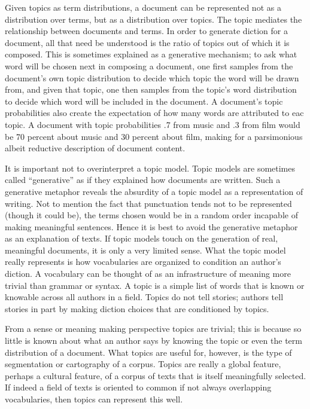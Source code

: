 \documentclass[]{book}
\theoremstyle{definition}
\theoremstyle{definition}
\theoremstyle{definition}
\theoremstyle{remark}
\begin{document}
Given topics as term distributions, a document can be represented not as
a distribution over terms, but as a distribution over topics. The topic
mediates the relationship between documents and terms. In order to
generate diction for a document, all that need be understood is the
ratio of topics out of which it is composed. This is sometimes explained
as a generative mechanism; to ask what word will be chosen next in
composing a document, one first samples from the document's own topic
distribution to decide which topic the word will be drawn from, and
given that topic, one then samples from the topic's word distribution to
decide which word will be included in the document. A document's topic
probabilities also create the expectation of how many words are
attributed to eac topic. A document with topic probabilities .7 from
music and .3 from film would be 70 percent about music and 30 percent
about film, making for a parsimonious albeit reductive description of
document content.

It is important not to overinterpret a topic model. Topic models are
sometimes called ``generative'' as if they explained how documents are
written. Such a generative metaphor reveals the absurdity of a topic
model as a representation of writing. Not to mention the fact that
punctuation tends not to be represented (though it could be), the terms
chosen would be in a random order incapable of making meaningful
sentences. Hence it is best to avoid the generative metaphor as an
explanation of texts. If topic models touch on the generation of real,
meaningful documents, it is only a very limited sense. What the topic
model really represents is how vocabularies are organized to condition
an author's diction. A vocabulary can be thought of as an infrastructure
of meaning more trivial than grammar or syntax. A topic is a simple list
of words that is known or knowable across all authors in a field. Topics
do not tell stories; authors tell stories in part by making diction
choices that are conditioned by topics.

From a sense or meaning making perspective topics are trivial; this is
because so little is known about what an author says by knowing the
topic or even the term distribution of a document. What topics are
useful for, however, is the type of segmentation or cartography of a
corpus. Topics are really a global feature, perhaps a cultural feature,
of a corpus of texts that is itself meaningfully selected. If indeed a
field of texts is oriented to common if not always overlapping
vocabularies, then topics can represent this well.
\end{document}
